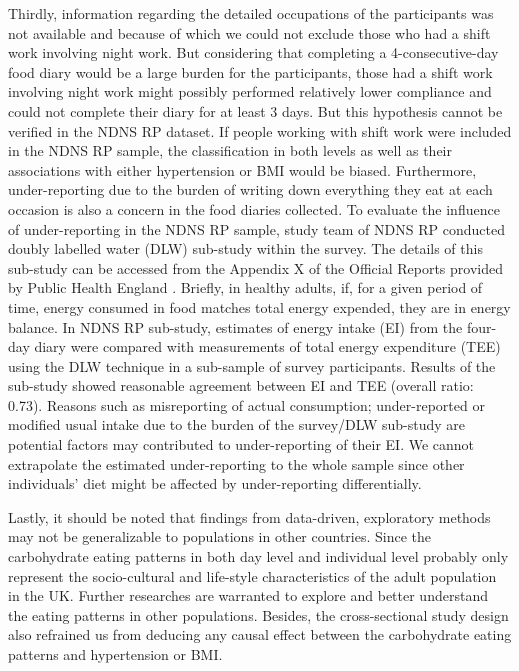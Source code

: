 Thirdly, information regarding the detailed occupations of the participants was not available and because of which we could not exclude those who had a shift work involving night work. But considering that completing a 4-consecutive-day food diary would be a large burden for the participants, those had a shift work involving night work might possibly performed relatively lower compliance and could not complete their diary for at least 3 days. But this hypothesis cannot be verified in the NDNS RP dataset. If people working with shift work were included in the NDNS RP sample, the classification in both levels as well as their associations with either hypertension or BMI would be biased. Furthermore, under-reporting due to the burden of writing down everything they eat at each occasion is also a concern in the food diaries collected. To evaluate the influence of under-reporting in the NDNS RP sample, study team of NDNS RP conducted doubly labelled water (DLW) sub-study within the survey. The details of this sub-study can be accessed from the Appendix X of the Official Reports provided by Public Health England \parencite{bates2014national,roberts2018national,NDNSofficial}. Briefly, in healthy adults, if, for a given period of time, energy consumed in food matches total energy expended, they are in energy balance. In NDNS RP sub-study, estimates of energy intake (EI) from the four-day diary were compared with measurements of total energy expenditure (TEE) using the DLW technique in a sub-sample of survey participants. Results of the sub-study showed reasonable agreement between EI and TEE (overall ratio: 0.73). Reasons such as misreporting of actual consumption; under-reported or modified usual intake due to the burden of the survey/DLW sub-study are potential factors may contributed to under-reporting of their EI. We cannot extrapolate the estimated under-reporting to the whole sample since other individuals' diet might be affected by under-reporting differentially. 

Lastly, it should be noted that findings from data-driven, exploratory methods may not be
generalizable to populations in other countries. Since the carbohydrate eating patterns in both day level and individual level probably only represent the socio-cultural and life-style characteristics of the adult population in the UK. Further researches are warranted to explore and better understand the eating patterns in other populations. Besides, the cross-sectional study design also refrained us from deducing any causal effect between the carbohydrate eating patterns and hypertension or BMI. 

